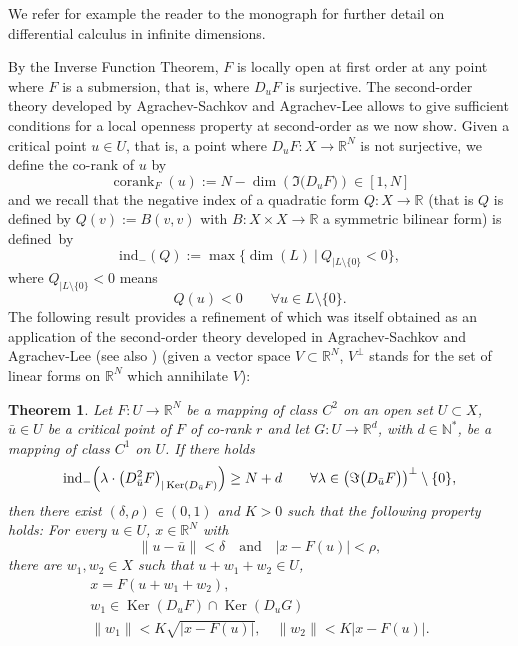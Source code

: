 \documentclass[JEP,XML,SOM,Unicode,NoFloatCountersInSection,published]{cedram}
\DeclareMathOperator{\corank}{corank}
\DeclareMathOperator{\Ker}{Ker}
\newcommand\R{\mathbb R}
\newcommand\N{\mathbb N}
\newtheorem{theorem}{Theorem}[section]
\theoremstyle{definition}
\begin{document}
We refer for example the reader to the monograph \cite{hamilton82} for further detail on differential calculus in infinite dimensions.

By the Inverse Function Theorem, $F$ is locally open \guillemotleft{} at first order \guillemotright{} at any point where $F$ is a submersion, that is, where $D_uF$ is surjective. The second-order theory developed by Agrachev-Sachkov \cite{as04} and Agrachev-Lee \cite{al09} allows to give sufficient conditions for a local openness property \guillemotleft{} at second-order \guillemotright{} as we now show. Given a critical point $u \in U$, that is, a point where $D_uF:X \to \R^N$ is not surjective, we define the co-rank of $u$ by
\[
\corank_F (u) := N - \dim \left(\Im \bigl(D_uF \bigr)\right) \in [1,N]
\]
and we recall that the negative index of a quadratic form $Q: X \to \R$ (that is $Q$ is defined by $Q(v):=B(v,v)$ with $B:X \times X \to \R$ a symmetric bilinear form) is defined~by
\[
\mathrm{ind}_- (Q) := \max \bigl\{ \dim (L) \ \vert \ Q_{\vert L \setminus \{0\}} <0 \bigr\},
\]
where $Q_{\vert L \setminus \{0\}} <0$ means
\[
Q(u) <0 \qquad \forall u \in L \setminus \{0\}.
\]
The following result provides a refinement of \cite[Th.\,B.3, p.\,128]{riffordbook} which was itself obtained as an application of the second-order theory developed in Agrachev-Sachkov \cite[Chap.\,20]{as04} and Agrachev-Lee \cite[\S 5]{al09} (see also \cite[Chap.\,12]{abb17}) (given a vector space $V\subset \R^N$, $V^{\perp}$ stands for the set of linear forms on $\R^N$ which annihilate $V$):

\begin{theorem}\label{THMopenquant}
Let $F: U \to \R^N$ be a mapping of class $C^2$ on an open set $U \subset X$, $\bar{u} \in U$ be a critical point of $F$ of co-rank $r$ and let $G :U \to \R^d$, with $d\in \N^*$, be a mapping of class $C^1$ on $U$. If there holds
\begin{equation}\label{ind}
\mathrm{ind}_- \Bigl(\lambda \cdot \left(D^2_{\bar{u}} F \right)_{\vert \Ker (D_{\bar{u}} F)} \Bigr) \geq N +d \qquad \forall \lambda \in \left(\Im \bigl(D_{\bar{u}} F \bigr)\right)^{\perp} \setminus \{0\},
\end{equation}
then there exist $(\delta, \rho) \in (0,1)$ and $K>0$ such that the following property holds: For every $u \in U$, $x\in \R^N$ with
\[
\| u - \bar{u}\| < \delta \quad \text{and} \quad |x-F(u)|<\rho,
\]
there are $w_1, w_2 \in X$ such that $u+w_1+w_2 \in U$,
\begin{gather*}
x=F(u+w_1+w_2),
\\
w_1 \in \Ker\left(D_uF\right) \cap \Ker\left(D_uG\right)
\\
\tag*{and}
\|w_1\|<K \sqrt{|x-F(u)|}, \quad \|w_2\|<K |x-F(u)|.
\end{gather*}
\end{theorem}
\end{document}
